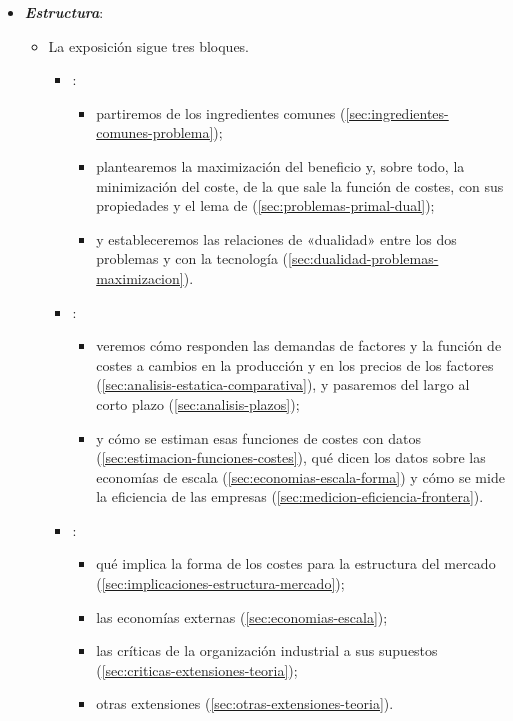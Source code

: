 \documentclass[11pt]{article}
\begin{document}
\begin{itemize}
\item \textbf{\emph{Estructura}}:
  \begin{itemize}
  \item La exposición sigue tres bloques.
  \begin{itemize}
  \item {}:
    \begin{itemize}
    \item partiremos de los ingredientes comunes (\ref{sec:ingredientes-comunes-problema});
    \item plantearemos la maximización del beneficio y, sobre todo, la minimización del coste, de la que sale la función de costes, con sus propiedades y el lema de  (\ref{sec:problemas-primal-dual});
    \item y estableceremos las relaciones de «dualidad» entre los dos problemas y con la tecnología (\ref{sec:dualidad-problemas-maximizacion}).
    \end{itemize}
  \item {}:
    \begin{itemize}
    \item veremos cómo responden las demandas de factores y la función de costes a cambios en la producción y en los precios de los factores (\ref{sec:analisis-estatica-comparativa}), y pasaremos del largo al corto plazo (\ref{sec:analisis-plazos});
    \item y cómo se estiman esas funciones de costes con datos (\ref{sec:estimacion-funciones-costes}), qué dicen los datos sobre las economías de escala (\ref{sec:economias-escala-forma}) y cómo se mide la eficiencia de las empresas (\ref{sec:medicion-eficiencia-frontera}).
    \end{itemize}
  \item {}:
    \begin{itemize}
    \item qué implica la forma de los costes para la estructura del mercado (\ref{sec:implicaciones-estructura-mercado});
    \item las economías externas (\ref{sec:economias-escala});
    \item las críticas de la organización industrial a sus supuestos (\ref{sec:criticas-extensiones-teoria});
    \item otras extensiones (\ref{sec:otras-extensiones-teoria}).

\end{itemize}
\end{itemize}
\end{itemize}
\end{itemize}
\end{document}
